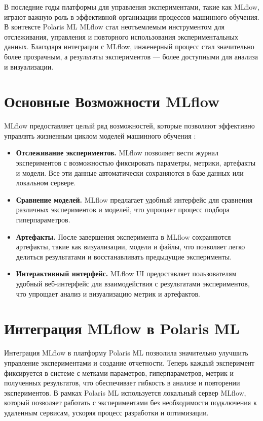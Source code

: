 \documentclass[14pt, a4paper]{bsu}
\begin{document}
В последние годы платформы для управления экспериментами, такие как MLflow,
играют важную роль в эффективной организации процессов машинного обучения. В
контексте Polaris ML MLflow стал неотъемлемым инструментом для отслеживания,
управления и повторного использования экспериментальных данных. Благодаря
интеграции с MLflow, инженерный процесс стал значительно более прозрачным, а
результаты экспериментов — более доступными для анализа и визуализации.

\section{Основные Возможности MLflow}

MLflow предоставляет целый ряд возможностей, которые позволяют эффективно
управлять жизненным циклом моделей машинного обучения \cite{mlflow_docs}:

\begin{itemize} \item \textbf{Отслеживание экспериментов.} MLflow позволяет
	      вести журнал экспериментов с возможностью фиксировать параметры, метрики,
	      артефакты и модели. Все эти данные автоматически сохраняются в базе
	      данных или локальном сервере. \item \textbf{Сравнение моделей.} MLflow
	      предлагает удобный интерфейс для сравнения различных экспериментов и
	      моделей, что упрощает процесс подбора гиперпараметров. \item
	      \textbf{Артефакты.} После завершения эксперимента в MLflow
	      сохраняются артефакты, такие как визуализации, модели и файлы, что
	      позволяет легко делиться результатами и восстанавливать предыдущие
	      эксперименты. \item \textbf{Интерактивный интерфейс.} MLflow UI
	      предоставляет пользователям удобный веб-интерфейс для
	      взаимодействия с результатами экспериментов, что упрощает анализ и
	      визуализацию метрик и артефактов. \end{itemize}

\section{Интеграция MLflow в Polaris ML}

Интеграция MLflow в платформу Polaris ML позволила значительно
улучшить управление экспериментами и создание отчетности. Теперь
каждый эксперимент фиксируется в системе с метками параметров,
гиперпараметров, метрик и полученных результатов, что обеспечивает
гибкость в анализе и повторении экспериментов. В рамках Polaris ML
используется локальный сервер MLflow, который позволяет работать с
экспериментами без необходимости подключения к удаленным сервисам,
ускоряя процесс разработки и оптимизации.
\end{document}
